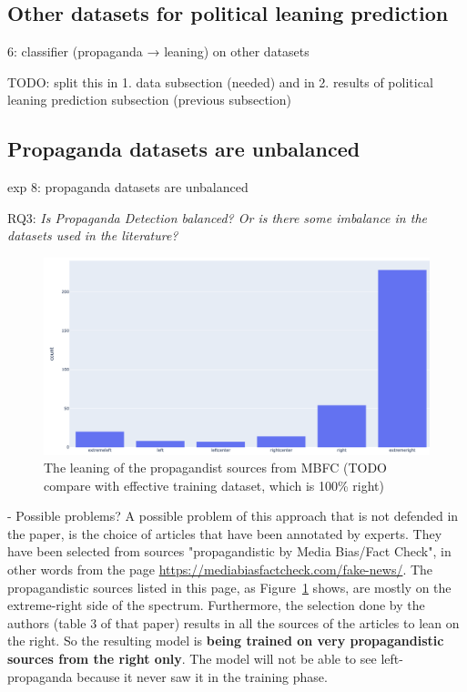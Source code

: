 \subsection{Other datasets for political leaning prediction}
6: classifier (propaganda → leaning) on other datasets

TODO: split this in 
1. data subsection (needed) and in
2. results of political leaning prediction subsection (previous subsection)

\subsection{\statusorange Propaganda datasets are unbalanced}

exp 8: propaganda datasets are unbalanced

RQ3: \emph{Is Propaganda Detection balanced? Or is there some imbalance in the datasets used in the literature?}

\begin{figure}[!htb]
   \centering
   \includegraphics[width=\linewidth]{figures/leaning_questionable.png}
   \caption{The leaning of the propagandist sources from MBFC (TODO compare with effective training dataset, which is 100\% right)}
   \label{fig:mbfc_leaning}
\end{figure}

- Possible problems?
A possible problem of this approach that is not defended in the paper, is the choice of articles that have been annotated by experts. They have been selected from sources "propagandistic by Media Bias/Fact Check", in other words from the page \url{https://mediabiasfactcheck.com/fake-news/}. The propagandistic sources listed in this page, as Figure~\ref{fig:mbfc_leaning} shows, are mostly on the extreme-right side of the spectrum. Furthermore, the selection done by the authors (table 3 of that paper) results in all the sources of the articles to lean on the right.
So the resulting model is \textbf{being trained on very propagandistic sources from the right only}. The model will not be able to see left-propaganda because it never saw it in the training phase.



